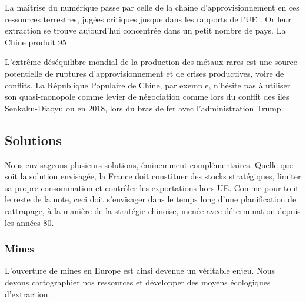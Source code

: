 \documentclass[a4paper]{article}
\begin{document}
La maîtrise du numérique passe par celle de la chaîne d’approvisionnement en ces ressources terrestres, jugées critiques jusque dans les rapports de l’UE . Or leur extraction se trouve aujourd’hui concentrée dans un petit nombre de pays. La Chine produit 95%

L’extrême déséquilibre mondial de la production des métaux rares est une source potentielle de ruptures d’approvisionnement et de crises productives, voire de conflits. La République Populaire de Chine, par exemple, n’hésite pas à utiliser son quasi-monopole comme levier de négociation comme lors du conflit des îles Senkaku-Diaoyu ou en 2018, lors du bras de fer avec l’administration Trump. 

\subsection{Solutions}
Nous envisageons plusieurs solutions, éminemment complémentaires. Quelle que soit la solution envisagée, la France doit constituer des stocks stratégiques, limiter sa propre consommation et contrôler les exportations hors UE. Comme pour tout le reste de la note, ceci doit s’envisager dans le temps long d’une planification de rattrapage, à la manière de la stratégie chinoise, menée avec détermination depuis les années 80\cite{strategiechinoise}. 
\subsubsection{Mines}
L’ouverture de mines en Europe est ainsi devenue un véritable enjeu. Nous devons cartographier nos ressources et développer des moyens écologiques d’extraction.
\end{document}
